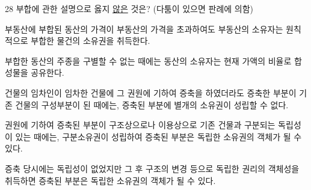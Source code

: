 \begin{question}{28}
부합에 관한 설명으로 옳지 \uline{않은} 것은? (다툼이 있으면 판례에 의함)
\begin{choices}
  \item 부동산에 부합된 동산의 가격이 부동산의 가격을 초과하여도 부동산의 소유자는 원칙적으로 부합한 물건의 소유권을 취득한다.
  \item 부합한 동산의 주종을 구별할 수 없는 때에는 동산의 소유자는 현재 가액의 비율로 합성물을 공유한다.
  \item 건물의 임차인이 임차한 건물에 그 권원에 기하여 증축을 하였더라도 증축한 부분이 기존 건물의 구성부분이 된 때에는, 증축된 부분에 별개의 소유권이 성립할 수 없다.
  \item 권원에 기하여 증축된 부분이 구조상으로나 이용상으로 기존 건물과 구분되는 독립성이 있는 때에는, 구분소유권이 성립하여 증축된 부분은 독립한 소유권의 객체가 될 수 있다.
  \item 증축 당시에는 독립성이 없었지만 그 후 구조의 변경 등으로 독립한 권리의 객체성을 취득하면 증축된 부분은 독립한 소유권의 객체가 될 수 있다.
\end{choices}
\end{question}
